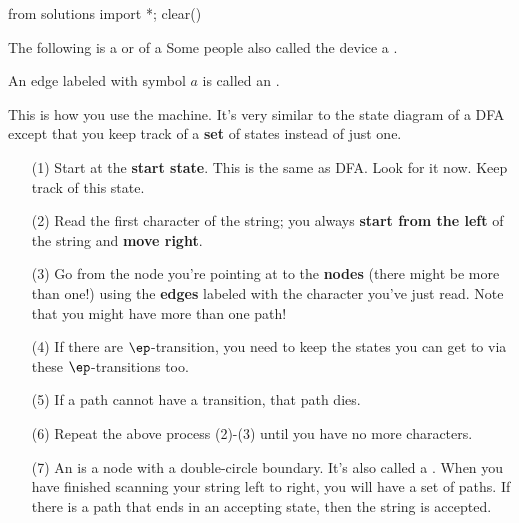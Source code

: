 \begin{python0}
from solutions import *; clear()
\end{python0}

The following is a
 or 
\tinysidebarskip{}
of a
Some people also called the device a
\sidebarskip{24pt}
.
\sidebarskip{0pt}

\begin{center}
\end{center}


An edge labeled with symbol $a$ is called an
.




This is how you use the machine. It's very similar to the state
diagram of a DFA except that you keep track of a
\textbf{set} of states
instead of just one.

\begin{itemize}
  \item[(1)] Start at the \textbf{start state}.
   This is the same as DFA. Look for it now. Keep track of this
   state.
 \item[(2)] Read the first character of the string; you always
 \textbf{start from the left} of the string and
 \textbf{move right}.
 \item[(3)] Go from the node you're pointing at to the
 \textbf{nodes}
 (there might be more than one!)
 using
 the \textbf{edges} labeled with the character you've just read.
 Note that you might have more than one path!
 \item[(4)] If there are $\ep$-transition, you need to keep the
  states
 you can get to via these $\ep$-transitions too.
 \item[(5)] If a path cannot have a transition, that path dies.
 \item[(6)] Repeat the above process (2)-(3) until you have no more characters.
 \item[(7)]
   An
   is a node with a double-circle boundary.
   It's also called a
   .
   When you have finished scanning your string left to right,
   you will have a set of paths.
   If there is a path that ends in an accepting state, then the
   string is accepted.
\end{itemize}


